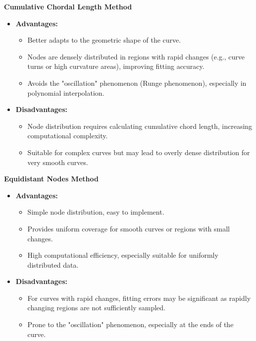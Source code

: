 \documentclass[a4paper]{article}
\begin{document}
\begin{sloppypar}
\textbf{Cumulative Chordal Length Method}
\begin{itemize}
  \item \textbf{Advantages:}
        \begin{itemize}
          \item Better adapts to the geometric shape of the curve.
          \item Nodes are densely distributed in regions with rapid changes (e.g., curve turns
                or high curvature areas), improving fitting accuracy.
          \item Avoids the "oscillation" phenomenon (Runge phenomenon), especially in
                polynomial interpolation.
        \end{itemize}
  \item \textbf{Disadvantages:}
        \begin{itemize}
          \item Node distribution requires calculating cumulative chord length, increasing
                computational complexity.
          \item Suitable for complex curves but may lead to overly dense distribution for very
                smooth curves.
        \end{itemize}
\end{itemize}

\textbf{Equidistant Nodes Method}
\begin{itemize}
  \item \textbf{Advantages:}
        \begin{itemize}
          \item Simple node distribution, easy to implement.
          \item Provides uniform coverage for smooth curves or regions with small changes.
          \item High computational efficiency, especially suitable for uniformly distributed
                data.
        \end{itemize}
  \item \textbf{Disadvantages:}
        \begin{itemize}
          \item For curves with rapid changes, fitting errors may be significant as rapidly
                changing regions are not sufficiently sampled.
          \item Prone to the "oscillation" phenomenon, especially at the ends of the curve.
        \end{itemize}
\end{itemize}


\end{sloppypar}
\end{document}
